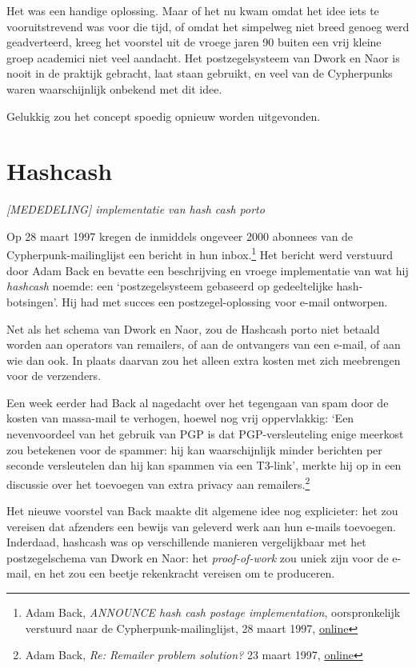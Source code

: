 \documentclass[
  a5paper,
  smalldemyvopaper,11pt,twoside,onecolumn,openright,extrafontsizes,
hidelinks]{memoir}
\begin{document}
Het was een handige oplossing. Maar of het nu kwam omdat het idee iets
te vooruitstrevend was voor die tijd, of omdat het simpelweg niet breed
genoeg werd geadverteerd, kreeg het voorstel uit de vroege jaren 90
buiten een vrij kleine groep academici niet veel aandacht. Het
postzegelsysteem van Dwork en Naor is nooit in de praktijk gebracht,
laat staan gebruikt, en veel van de Cypherpunks waren waarschijnlijk
onbekend met dit idee.

Gelukkig zou het concept spoedig opnieuw worden uitgevonden.

\section{Hashcash}\label{hashcash-1}

\emph{{[}MEDEDELING{]} implementatie van hash cash porto}

Op 28 maart 1997 kregen de inmiddels ongeveer 2000 abonnees van de
Cypherpunk-mailinglijst een bericht in hun inbox.\footnote{Adam Back,
  \emph{ANNOUNCE hash cash postage implementation}, oorspronkelijk
  verstuurd naar de Cypherpunk-mailinglijst, 28 maart 1997,
  \href{https://cypherpunks.venona.com/date/1997/03/msg00774.html}{online}}
Het bericht werd verstuurd door Adam Back en bevatte een beschrijving en
vroege implementatie van wat hij \emph{hashcash} noemde: een
`postzegelsysteem gebaseerd op gedeeltelijke hash-botsingen'. Hij had
met succes een postzegel-oplossing voor e-mail ontworpen.

Net als het schema van Dwork en Naor, zou de Hashcash porto niet betaald
worden aan operators van remailers, of aan de ontvangers van een e-mail,
of aan wie dan ook. In plaats daarvan zou het alleen extra kosten met
zich meebrengen voor de verzenders.

Een week eerder had Back al nagedacht over het tegengaan van spam door
de kosten van massa-mail te verhogen, hoewel nog vrij oppervlakkig: `Een
nevenvoordeel van het gebruik van PGP is dat PGP-versleuteling enige
meerkost zou betekenen voor de spammer: hij kan waarschijnlijk minder
berichten per seconde versleutelen dan hij kan spammen via een T3-link',
merkte hij op in een discussie over het toevoegen van extra privacy aan
remailers.\footnote{Adam Back, \emph{Re: Remailer problem solution?} 23
  maart 1997,
  \href{https://cypherpunks.venona.com/date/1997/03/msg00631.html}{online}}

Het nieuwe voorstel van Back maakte dit algemene idee nog explicieter:
het zou vereisen dat afzenders een bewijs van geleverd werk aan hun
e-mails toevoegen. Inderdaad, hashcash was op verschillende manieren
vergelijkbaar met het postzegelschema van Dwork en Naor: het
\emph{proof-of-work} zou uniek zijn voor de e-mail, en het zou een
beetje rekenkracht vereisen om te produceren.
\end{document}
